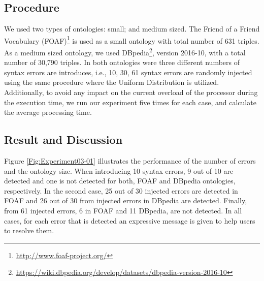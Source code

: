

\subsection{Procedure}

We used two types of ontologies: small; and medium sized. 
The Friend of a Friend Vocabulary (FOAF)\footnote{\url{http://www.foaf-project.org/}} is used as a small ontology with total number of 631 triples. 
As a medium sized ontology, we used DBpedia\footnote{\url{https://wiki.dbpedia.org/develop/datasets/dbpedia-version-2016-10}}, version 2016-10, with a total number of 30,790 triples. 
In both ontologies were three different numbers of syntax errors are introduces, i.e., 10, 30, 61 syntax errors are randomly injected using the same procedure where the Uniform Distribution is utilized.
Additionally, to avoid any impact on the current overload of the processor during the execution time, we run our experiment five times for each case, and calculate the average processing time.

 
\subsection{Result and Discussion}

Figure \ref{Fig:Experiment03-01} illustrates the performance of the number of errors and the ontology size. 
When introducing 10 syntax errors, 9 out of 10 are detected and one is not detected for both, FOAF and DBpedia ontologies, respectively. 
In the second case, 25 out of 30 injected errors are detected in FOAF and 26 out of 30 from injected errors in DBpedia are detected. 
Finally, from 61 injected errors, 6 in FOAF and 11 DBpedia, are not detected.
In all cases, for each error that is detected an expressive message is given to help users to resolve them. 

